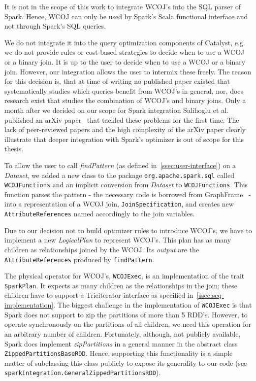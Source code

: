 It is not in the scope of this work to integrate WCOJ's into the SQL parser of Spark.
Hence, WCOJ can only be used by Spark's Scala functional interface and not through Spark's SQL queries.

We do not integrate it into the query optimization components of Catalyst, e.g. we do not provide rules or cost-based strategies to
decide when to use a WCOJ or a binary join.
It is up to the user to decide when to use a WCOJ or a binary join.
However, our integration allows the user to intermix these freely.
The reason for this decision is, that at time of writing no published paper existed that systematically studies which queries benefit from
WCOJ's in general, nor, does research exist that studies the combination of WCOJ's and binary joins.
Only a month after we decided on our scope for Spark integration Salihoglu et al. published an arXiv paper~\cite{mhedhbi2019} that
tackled these problems for the first time.
The lack of peer-reviewed papers and the high complexity of the arXiv paper clearly illustrate that deeper integration with
Spark's optimizer is out of scope for this thesis.

To allow the user to call \textit{findPattern} (as defined in~\cref{ssec:user-interface}) on a \textit{Dataset}, we added a new class
to the package \texttt{org.apache.spark.sql} called \texttt{WCOJFunctions} and an implicit conversion from \textit{Dataset} to
\texttt{WCOJFunctions}.
This function parses the pattern - the necessary code is borrowed from GraphFrame~\cite{graphframe} - into a representation of a WCOJ join,
\texttt{JoinSpecification}, and creates new \texttt{AttributeReferences} named accordingly to the join variables.

Due to our decision not to build optimizer rules to introduce WCOJ's, we have to implement a new \textit{LogicalPlan} to represent WCOJ's.
This plan has as many children as relationships joined by the WCOJ.
Its \textit{output} are the \texttt{AttributeReferences} produced by \texttt{findPattern}.

The physical operator for WCOJ's, \texttt{WCOJExec}, is an implementation of the trait \texttt{SparkPlan}.
It expects as many children as the relationships in the join;
these children have to support a Trieiterator interface as specified in~\cref{ssec:seq-implementation}.
The biggest challenge in the implementation of \texttt{WCOJExec} is that Spark does not support to zip the partitions of more than 5 RDD's.
However, to operate synchronously on the partitions of all children, we need this operation for an arbitrary number of children.
Fortunately, although, not publicly available, Spark does implement \textit{zipPartitions} in a general manner in
the abstract class \texttt{ZippedPartitionsBaseRDD}.
Hence, supporting this functionality is a simple matter of subclassing this class publicly to expose its generality to our code (see
\texttt{sparkIntegration.GeneralZippedPartitionsRDD}).


